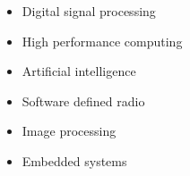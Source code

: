 \begin{itemize}
	\item Digital signal processing
	\item High performance computing
	\item Artificial intelligence
	\item Software defined radio
	\item Image processing
	\item Embedded systems
	      \\
\end{itemize}

